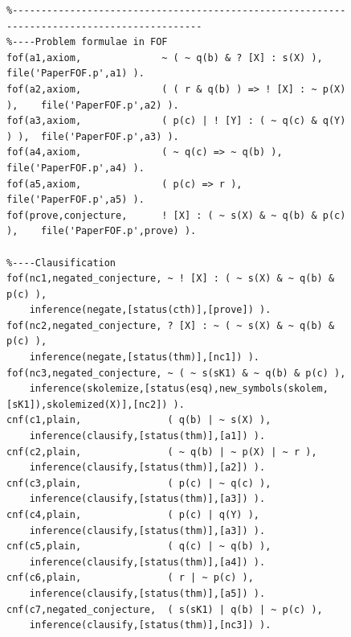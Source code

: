 \documentclass[runningheads]{llncs}
\begin{document}
\begin{figure}[htb]
\centering
{\scriptsize
{\setlength{\baselineskip}{3mm}
\begin{verbatim}
%--------------------------------------------------------------------------------------------
%----Problem formulae in FOF
fof(a1,axiom,              ~ ( ~ q(b) & ? [X] : s(X) ),           file('PaperFOF.p',a1) ).
fof(a2,axiom,              ( ( r & q(b) ) => ! [X] : ~ p(X) ),    file('PaperFOF.p',a2) ).
fof(a3,axiom,              ( p(c) | ! [Y] : ( ~ q(c) & q(Y) ) ),  file('PaperFOF.p',a3) ).
fof(a4,axiom,              ( ~ q(c) => ~ q(b) ),                  file('PaperFOF.p',a4) ).
fof(a5,axiom,              ( p(c) => r ),                         file('PaperFOF.p',a5) ).
fof(prove,conjecture,      ! [X] : ( ~ s(X) & ~ q(b) & p(c) ),    file('PaperFOF.p',prove) ).

%----Clausification
fof(nc1,negated_conjecture, ~ ! [X] : ( ~ s(X) & ~ q(b) & p(c) ),
    inference(negate,[status(cth)],[prove]) ).
fof(nc2,negated_conjecture, ? [X] : ~ ( ~ s(X) & ~ q(b) & p(c) ),
    inference(negate,[status(thm)],[nc1]) ).
fof(nc3,negated_conjecture, ~ ( ~ s(sK1) & ~ q(b) & p(c) ),
    inference(skolemize,[status(esq),new_symbols(skolem,[sK1]),skolemized(X)],[nc2]) ).
cnf(c1,plain,               ( q(b) | ~ s(X) ),
    inference(clausify,[status(thm)],[a1]) ).
cnf(c2,plain,               ( ~ q(b) | ~ p(X) | ~ r ),
    inference(clausify,[status(thm)],[a2]) ).
cnf(c3,plain,               ( p(c) | ~ q(c) ),
    inference(clausify,[status(thm)],[a3]) ).
cnf(c4,plain,               ( p(c) | q(Y) ),
    inference(clausify,[status(thm)],[a3]) ).
cnf(c5,plain,               ( q(c) | ~ q(b) ),
    inference(clausify,[status(thm)],[a4]) ).
cnf(c6,plain,               ( r | ~ p(c) ),
    inference(clausify,[status(thm)],[a5]) ).
cnf(c7,negated_conjecture,  ( s(sK1) | q(b) | ~ p(c) ),
    inference(clausify,[status(thm)],[nc3]) ).


\end{verbatim}}}
\end{figure}
\end{document}
